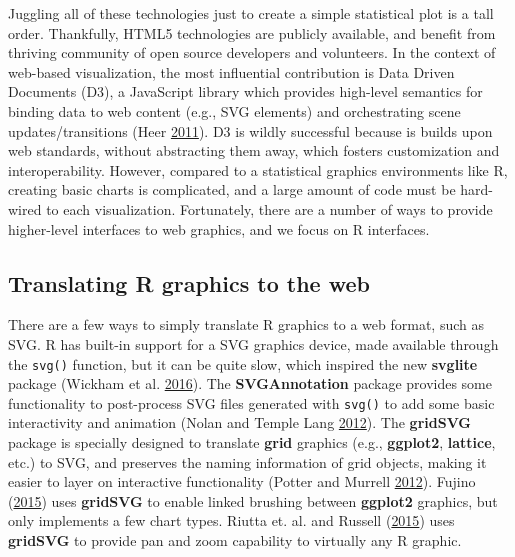 \documentclass[12pt,]{isuthesis}
\begin{document}
Juggling all of these technologies just to create a simple statistical
plot is a tall order. Thankfully, HTML5 technologies are publicly
available, and benefit from thriving community of open source developers
and volunteers. In the context of web-based visualization, the most
influential contribution is Data Driven Documents (D3), a JavaScript
library which provides high-level semantics for binding data to web
content (e.g., SVG elements) and orchestrating scene updates/transitions
(Heer \protect\hyperlink{ref-Bostock:2011}{2011}). D3 is wildly
successful because is builds upon web standards, without abstracting
them away, which fosters customization and interoperability. However,
compared to a statistical graphics environments like R, creating basic
charts is complicated, and a large amount of code must be hard-wired to
each visualization. Fortunately, there are a number of ways to provide
higher-level interfaces to web graphics, and we focus on R interfaces.

\subsection{Translating R graphics to the
web}\label{translating-r-graphics-to-the-web}

There are a few ways to simply translate R graphics to a web format,
such as SVG. R has built-in support for a SVG graphics device, made
available through the \texttt{svg()} function, but it can be quite slow,
which inspired the new \textbf{svglite} package (Wickham et al.
\protect\hyperlink{ref-svglite}{2016}). The \textbf{SVGAnnotation}
package provides some functionality to post-process SVG files generated
with \texttt{svg()} to add some basic interactivity and animation (Nolan
and Temple Lang \protect\hyperlink{ref-SVGAnnotation}{2012}). The
\textbf{gridSVG} package is specially designed to translate
\textbf{grid} graphics (e.g., \textbf{ggplot2}, \textbf{lattice}, etc.)
to SVG, and preserves the naming information of grid objects, making it
easier to layer on interactive functionality (Potter and Murrell
\protect\hyperlink{ref-gridSVGreport}{2012}). Fujino
(\protect\hyperlink{ref-vdmR}{2015}) uses \textbf{gridSVG} to enable
linked brushing between \textbf{ggplot2} graphics, but only implements a
few chart types. Riutta et. al. and Russell
(\protect\hyperlink{ref-svgPanZoom}{2015}) uses \textbf{gridSVG} to
provide pan and zoom capability to virtually any R graphic.
\end{document}
